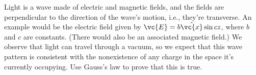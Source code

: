 Light is a wave made of electric and magnetic fields, and the
fields are perpendicular to the direction of the wave's motion, i.e.,
they're transverse. An example would be the electric
field given by $\vc{E}=b \hat{\vc{x}} \sin cz$, where $b$ and $c$
are constants. (There would also be an associated magnetic field.)
We observe that light can travel through a vacuum, so we expect that
this wave pattern is consistent with the nonexistence of any
charge in the space it's currently occupying. Use Gauss's law
to prove that this is true.
